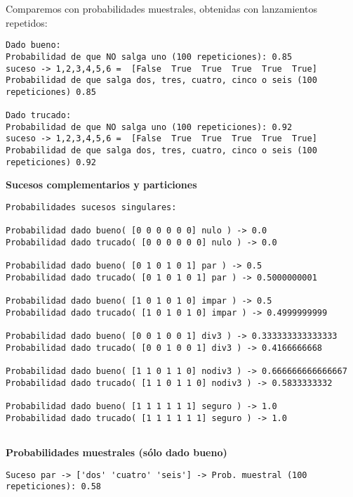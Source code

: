 \documentclass[11pt]{article}
\begin{document}
    Comparemos con probabilidades muestrales, obtenidas con lanzamientos
repetidos:

    \begin{Verbatim}[commandchars=\\\{\}]
Dado bueno:
Probabilidad de que NO salga uno (100 repeticiones): 0.85
suceso -> 1,2,3,4,5,6 =  [False  True  True  True  True  True]
Probabilidad de que salga dos, tres, cuatro, cinco o seis (100 repeticiones) 0.85

Dado trucado:
Probabilidad de que NO salga uno (100 repeticiones): 0.92
suceso -> 1,2,3,4,5,6 =  [False  True  True  True  True  True]
Probabilidad de que salga dos, tres, cuatro, cinco o seis (100 repeticiones) 0.92

    \end{Verbatim}

    \textbf{Sucesos complementarios y particiones}

    \begin{Verbatim}[commandchars=\\\{\}]
Probabilidades sucesos singulares:

Probabilidad dado bueno( [0 0 0 0 0 0] nulo ) -> 0.0
Probabilidad dado trucado( [0 0 0 0 0 0] nulo ) -> 0.0 

Probabilidad dado bueno( [0 1 0 1 0 1] par ) -> 0.5
Probabilidad dado trucado( [0 1 0 1 0 1] par ) -> 0.5000000001 

Probabilidad dado bueno( [1 0 1 0 1 0] impar ) -> 0.5
Probabilidad dado trucado( [1 0 1 0 1 0] impar ) -> 0.4999999999 

Probabilidad dado bueno( [0 0 1 0 0 1] div3 ) -> 0.333333333333333
Probabilidad dado trucado( [0 0 1 0 0 1] div3 ) -> 0.4166666668 

Probabilidad dado bueno( [1 1 0 1 1 0] nodiv3 ) -> 0.666666666666667
Probabilidad dado trucado( [1 1 0 1 1 0] nodiv3 ) -> 0.5833333332 

Probabilidad dado bueno( [1 1 1 1 1 1] seguro ) -> 1.0
Probabilidad dado trucado( [1 1 1 1 1 1] seguro ) -> 1.0 


    \end{Verbatim}

    \textbf{Probabilidades muestrales (sólo dado bueno)}

    \begin{Verbatim}[commandchars=\\\{\}]
Suceso par -> ['dos' 'cuatro' 'seis'] -> Prob. muestral (100 repeticiones): 0.58

    \end{Verbatim}
\end{document}
